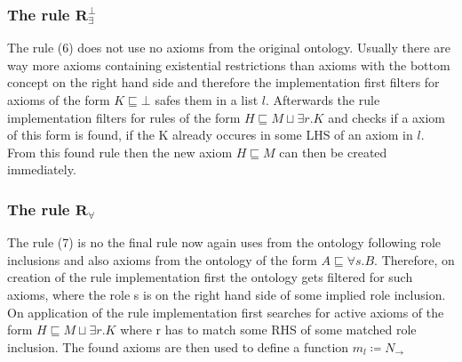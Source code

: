 \documentclass[titlepage]{article}
\begin{document}
\subsubsection{The rule $\mathbf{R^\bot_{\exists}}$}
The rule (6) does not use no axioms from the original ontology. Usually there are way more axioms 
containing existential restrictions than axioms with the bottom concept on the right hand side and
therefore the implementation first filters for axioms of the form $K \sqsubseteq \bot$ safes them
in a list $l$. Afterwards
the rule implementation filters for rules of the form $H \sqsubseteq M \sqcup \exists r.K $
and checks if a axiom of this form is found, if the K already occures in some LHS of an axiom in
$l$. From this found rule then the new axiom $H \sqsubseteq M$ can then be created immediately.

\subsubsection{The rule $\mathbf{R_{\forall}}$}
The rule (7) is no the final rule now again uses from the ontology following role inclusions
and also axioms from the ontology of the form $A \sqsubseteq \forall s.B$. Therefore, on 
creation of the rule implementation first the ontology gets filtered for such axioms, where 
the role s is on the right hand side of some implied role inclusion.
On application of the rule implementation first searches for active axioms of the form
$H \sqsubseteq M \sqcup \exists r.K$ where r has to match some RHS of some matched role inclusion.
The found axioms are then used to define a function $m_l \coloneqq N_ \rightarrow$
\end{document}

